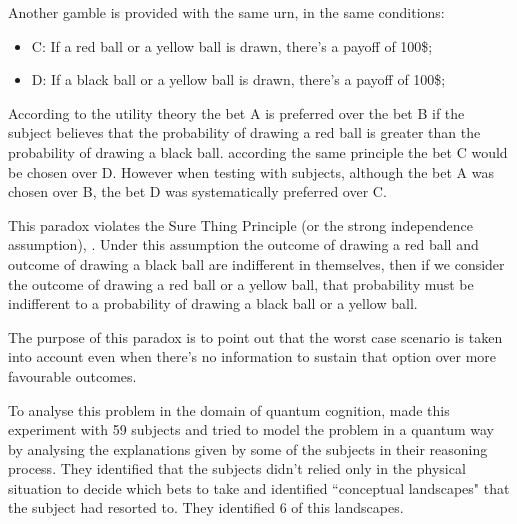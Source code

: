 Another gamble is provided with the same urn, in the same conditions:

\begin{itemize}
\item C: If a red ball or a yellow ball is drawn, there's a payoff of 100\$;
\item D: If a black ball or a yellow ball is drawn, there's a payoff of 
100\$; 
\end{itemize}

According to the utility theory the bet A is preferred over the bet B if the 
subject believes that the probability of drawing a red ball is greater than 
the probability of drawing a black ball. according the same principle the bet 
C would be chosen over D. However when testing with subjects, although the 
bet A was chosen over B, the bet D was systematically preferred over C. 

This paradox violates the Sure Thing Principle (or the strong independence assumption), \cite{Savage1954}. Under this assumption the outcome of drawing a red ball and outcome of drawing a black ball are indifferent in themselves, then if we consider the outcome of drawing a red ball or a yellow ball, that probability  must be indifferent to a probability of drawing a black ball or a yellow ball.

The purpose of this paradox is to point out that the worst case scenario is 
taken into account even when there's no information to sustain that option 
over more favourable outcomes. 

To analyse this problem in the domain of 
quantum cognition\cite[Aerts et al]{Aerts2011}, made this experiment with 59 
subjects and tried to model the problem in a quantum way by analysing the 
explanations given by some of the subjects in their reasoning process. They 
identified that the subjects didn't relied only in the physical situation to 
decide which bets to take and identified ``conceptual 
landscapes" that the 
subject had resorted to. They identified 6 of this landscapes.

